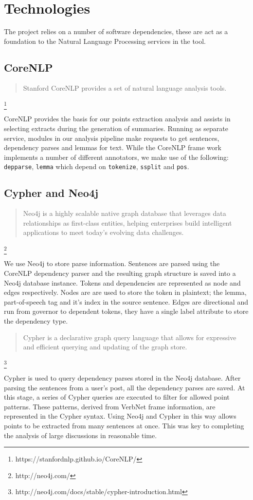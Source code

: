 \chapter{Technologies\label{chap:technologies}}
  The project relies on a number of software dependencies, these are act as a foundation to the Natural Language Processing services in the tool.

  \tocless\section{CoreNLP}
    \blockquote{Stanford CoreNLP provides a set of natural language analysis tools.}\footnote{https://stanfordnlp.github.io/CoreNLP/}

    CoreNLP provides the basis for our points extraction analysis and assists in selecting extracts during the generation of summaries. Running as separate service, modules in our analysis pipeline make requests to get sentences, dependency parses and lemmas for text. While the CoreNLP frame work implements a number of different annotators, we make use of the following: \texttt{depparse}, \texttt{lemma} which depend on \texttt{tokenize}, \texttt{ssplit} and \texttt{pos}.

  \tocless\section{Cypher and Neo4j}
    \blockquote{Neo4j is a highly scalable native graph database that leverages data relationships as first-class entities, helping enterprises build intelligent applications to meet today's evolving data challenges.}\footnote{http://neo4j.com/}

    We use Neo4j to store parse information. Sentences are parsed using the CoreNLP dependency parser and the resulting graph structure is saved into a Neo4j database instance. Tokens and dependencies are represented as node and edges respectively. Nodes are are used to store the token in plaintext; the lemma, part-of-speech tag and it's index in the source sentence. Edges are directional and run from governor to dependent tokens, they have a single label attribute to store the dependency type.

    \blockquote{Cypher is a declarative graph query language that allows for expressive and efficient querying and updating of the graph store.}\footnote{http://neo4j.com/docs/stable/cypher-introduction.html}

    Cypher is used to query dependency parses stored in the Neo4j database. After parsing the sentences from a user's post, all the dependency parses are saved. At this stage, a series of Cypher queries are executed to filter for allowed point patterns. These patterns, derived from VerbNet frame information, are represented in the Cypher syntax. Using Neo4j and Cypher in this way allows points to be extracted from many sentences at once. This was key to completing the analysis of large discussions in reasonable time.

